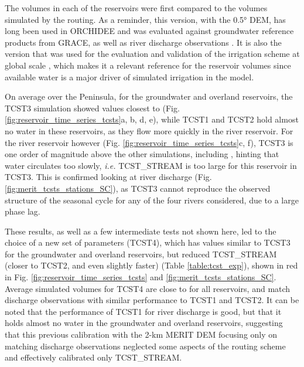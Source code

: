
The volumes in each of the reservoirs were first compared to the volumes simulated by the \std routing. As a reminder, this version, with the 0.5° DEM, has long been used in ORCHIDEE and was evaluated against groundwater reference products from GRACE, as well as river discharge observations  \citep{ngo-duc_53-year_2005, ngo-duc_validation_2007}.
It is also the version that was used for the evaluation and validation of the irrigation scheme at global scale \citep{arboleda-obando_validation_2024}, which makes it a relevant reference for the reservoir volumes since available water is a major driver of simulated irrigation in the model. 

On average over the Peninsula, for the groundwater and overland reservoirs, the TCST3 simulation showed values closest to \std (Fig. \ref{fig:reservoir_time_series_tcsts}a, b, d, e), while TCST1 and TCST2 hold almost no water in these reservoirs, as they flow more quickly in the river reservoir. For the river reservoir however (Fig. \ref{fig:reservoir_time_series_tcsts}c, f), TCST3 is one order of magnitude above the other simulations, including \std, hinting that water circulates too slowly, \textit{i.e.}  TCST\_STREAM is too large for this reservoir in TCST3. This is confirmed looking at river discharge (Fig. \ref{fig:merit_tcsts_stations_SC}), as TCST3 cannot reproduce the observed structure of the seasonal cycle for any of the four rivers considered, due to a large phase lag. 

These results, as well as a few intermediate tests not shown here, led to the choice of a new set of parameters (TCST4), which has values similar to TCST3 for the groundwater and overland reservoirs, but reduced TCST\_STREAM (closer to TCST2, and even slightly faster) (Table \ref{table:tcst_exp}), shown in red in Fig. \ref{fig:reservoir_time_series_tcsts} and \ref{fig:merit_tcsts_stations_SC}.
Average simulated volumes for TCST4 are close to \std for all reservoirs, and match discharge observations with similar performance to TCST1 and TCST2.
It can be noted that the performance of TCST1 for river discharge is good, but that it holds almost no water in the groundwater and overland reservoirs, suggesting that this previous calibration with the 2-km MERIT DEM focusing only on matching discharge observations \citep{kilic_evaluation_2023} neglected some aspects of the routing scheme and effectively calibrated only TCST\_STREAM.


